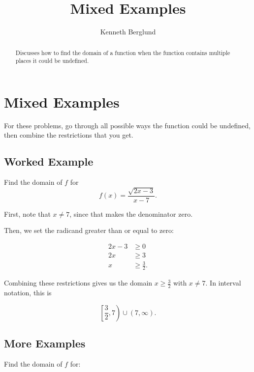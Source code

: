 \documentclass{ximera}
\title{Mixed Examples}
\author{Kenneth Berglund}
\begin{document}
\begin{abstract}
Discusses how to find the domain of  a function when the function contains multiple places it could be undefined. 
\end{abstract}
\maketitle

\section{Mixed Examples}
For these problems, go through all possible ways the function could be undefined, then combine the restrictions that you get.

\subsection{Worked Example}
Find the domain of $f$ for $$f(x) = \frac{\sqrt{2x - 3}}{x - 7}.$$

\begin{explanation}
First, note that $x \ne 7$, since that makes the denominator zero.

Then, we set the radicand greater than or equal to zero:

\begin{align*}2x-3&\ge 0 \\ 2x & \ge 3 \\ x & \ge \frac{3}{2}. \end{align*}

Combining these restrictions gives us the domain $x \ge \frac{3}{2}$ with $x \ne 7$. In interval notation, this is

$$\left[\frac{3}{2}, 7\right) \cup (7, \infty).$$
\end{explanation}
\subsection{More Examples}
Find the domain of $f$ for:
\end{document}
